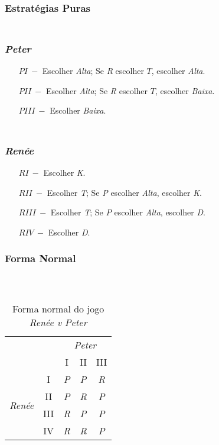 \subsubsection*{Estratégias Puras}
\begin{frame}
\frametitle{\subsubsecname\\\emph{Peter}}
\begin{enumerate}
	\item[$ PI\ -$] Escolher \emph{Alta}; Se \emph{R} escolher $T$, escolher \emph{Alta}.
	\item[$ PII\ -$] Escolher \emph{Alta}; Se \emph{R} escolher $T$, escolher \emph{Baixa}.
	\item[$ PIII\ -$] Escolher \emph{Baixa}.
\end{enumerate}
\end{frame}

\begin{frame}
\frametitle{\subsubsecname\\\emph{Renée}}
\begin{enumerate}
	\item[$ RI\ -$] Escolher \emph{K}.
	\item[$ RII\ -$] Escolher \emph{T}; Se \emph{P} escolher \emph{Alta}, escolher \emph{K}.
	\item[$ RIII\ -$] Escolher \emph{T}; Se \emph{P} escolher \emph{Alta}, escolher \emph{D}.
	\item[$ RIV\ -$] Escolher \emph{D}.
\end{enumerate}
\end{frame}

\subsubsection*{Forma Normal}
\begin{frame}
\frametitle{\subsecname\\}
\begin{table}[ht]
\centering
\begin{tabular}{cc|ccc}
\hline
 &  & \multicolumn{3}{c}{\emph{Peter}}\tabularnewline
 &  & I & II & III\tabularnewline
\hline
\multirow{4}{*}{\begin{turn}{90}
\emph{Renée}
\end{turn}} & I & \emph{P} & \emph{P} & \emph{R}\tabularnewline
 & II & \emph{P} & \emph{R} & \emph{P}\tabularnewline
 & III & \emph{R} & \emph{P} & \emph{P}\tabularnewline
 & IV & \emph{R} & \emph{R} & \emph{P}\tabularnewline
\hline
\end{tabular}
\caption{Forma normal do jogo \emph{Renée v Peter}}
\label{tab:forma-normal-do-jogo-renee-v-peter}
\end{table}
\end{frame}

